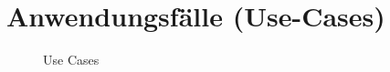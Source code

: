 \documentclass[a4paper,10pt,titlepage]{article}
\makeatletter
\newcommand\novspace{\@minipagetrue}
\newenvironment{owncompactitem}{%
\compactitem
}{%
\@finalstrut\@arstrutbox
\@nameuse{endcompactitem}%
\aftergroup\let\aftergroup\@finalstrut\aftergroup\@gobble
}
\newenvironment{owncompactenum}{%
\compactenum
}{%
\@finalstrut\@arstrutbox
\@nameuse{endcompactenum}%
\aftergroup\let\aftergroup\@finalstrut\aftergroup\@gobble
}
\newcommand{\usecase}[7]
{\subsection{#1}
\setlength{\extrarowheight}{2pt}
\begin{tabular}{|p{0.2\textwidth}|p{0.9\textwidth}|}
\hline
  Akteure & #2\\\hline
  Ziel & #3\\\hline
  Vorbedingungen & \novspace
  	\begin{owncompactitem}[-] #4 \end{owncompactitem} \\\hline
  Normalablauf & \vspace{-7pt}
  	\begin{owncompactenum}[1.] #6 \end{owncompactenum} \\\hline
  Nachbedingungen & \novspace
  	\begin{owncompactitem}[-] #5 \end{owncompactitem} \\\hline
  #7
\end{tabular}
}
\newcommand{\sonderfall}[4][\empty]
{
Sonderfall #2 & \vspace{-10pt}
	\textit{#3}
	\begin{owncompactenum}[{#2}.1] {#4} \end{owncompactenum}
  	\ifthenelse{\equal{#1}{\empty}}
    	{\\\hline} %
    	{\ensuremath{\rightarrow} #1 \\ [+1pt] \hline} %

}
\newcommand{\kurzersonderfall}[3][\empty]
{
Sonderfall #2 & \vspace{-10pt}
	\textit{#3}
  	\ifthenelse{\equal{#1}{\empty}}
    	{\\\hline} %
    	{\\&\ensuremath{\rightarrow} #1 \\ [+1pt] \hline} %

}
\newcommand{\sondernachbedingung}[1]
{
Nachbedingungen im Sonderfall& \novspace
	\begin{owncompactitem}[-]
		#1
	\end{owncompactitem} \\\hline
}
\makeatother
\begin{document}
\clearpage
\section{Anwendungsfälle (Use-Cases)}
\begin{figure}[H]
  \centering
  \caption{Use Cases}
\end{figure}




{%
}{%
}{%
}{%
}{%
}

{%
}{%
}

{%
}
\end{document}
